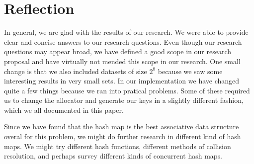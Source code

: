 \documentclass[12pt,a4paper]{article}
\begin{document}
    \section{Reflection}
    In general, we are glad with the results of our research. We were able to provide clear and concise answers to our
    research questions. Even though our research questions may appear broad, we have defined a good scope in our research
    proposal and have virtually not mended this scope in our research. One small change is that we also included datasets of
    size $2^8$ because we saw some interesting results in very small sets. In our implementation we have changed quite a few
    things because we ran into pratical problems. Some of these required us to change the allocator and generate our keys
    in a slightly different fashion, which we all documented in this paper.
    
    Since we have found that the hash map is the best associative data structure overal for this problem, we might do further
    research in different kind of hash maps. We might try different hash functions, different methods of collision resolution,
    and perhaps survey different kinds of concurrent hash maps.
    
    

    
\end{document}
